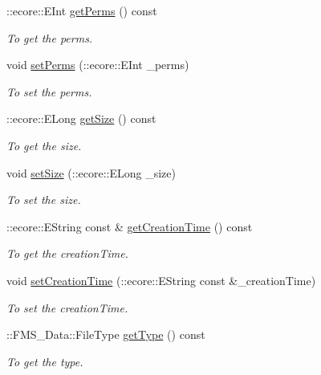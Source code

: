 \begin{DoxyCompactItemize}
::ecore::EInt \hyperlink{classFMS__Data_1_1DirEntry_a2a37f1c3377f0faac74377bfc742081a}{getPerms} () const 
\begin{DoxyCompactList}\small\item\em To get the perms. \item\end{DoxyCompactList}\item 
void \hyperlink{classFMS__Data_1_1DirEntry_a2c43f8f796b635c47c25953dbfddb199}{setPerms} (::ecore::EInt \_\-perms)
\begin{DoxyCompactList}\small\item\em To set the perms. \item\end{DoxyCompactList}\item 
::ecore::ELong \hyperlink{classFMS__Data_1_1DirEntry_a082899c6e532bc7b60861623dc794f2e}{getSize} () const 
\begin{DoxyCompactList}\small\item\em To get the size. \item\end{DoxyCompactList}\item 
void \hyperlink{classFMS__Data_1_1DirEntry_a99ecf1dc1e684737436bb1b03a9137bb}{setSize} (::ecore::ELong \_\-size)
\begin{DoxyCompactList}\small\item\em To set the size. \item\end{DoxyCompactList}\item 
::ecore::EString const \& \hyperlink{classFMS__Data_1_1DirEntry_adf9963e9b39a6e82459089df5985dd4f}{getCreationTime} () const 
\begin{DoxyCompactList}\small\item\em To get the creationTime. \item\end{DoxyCompactList}\item 
void \hyperlink{classFMS__Data_1_1DirEntry_ad0888717a2a0db0d4debffbc3f0954fe}{setCreationTime} (::ecore::EString const \&\_\-creationTime)
\begin{DoxyCompactList}\small\item\em To set the creationTime. \item\end{DoxyCompactList}\item 
::FMS\_\-Data::FileType \hyperlink{classFMS__Data_1_1DirEntry_a286794e55c317243227140b18bbc6447}{getType} () const 
\begin{DoxyCompactList}\small\item\em To get the type. \item\end{DoxyCompactList}\item 

\end{DoxyCompactItemize}
